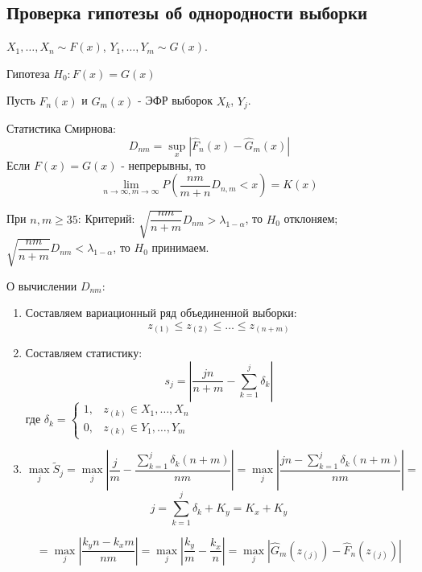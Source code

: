 \subsection{Проверка гипотезы об однородности выборки}

$X_1, \dots, X_n \sim F(x)$, $Y_1, \dots, Y_m \sim G(x)$.

Гипотеза $H_0: F(x) = G(x)$

\begin{theorem}[Смирнов]
  Пусть $\hat F_n(x) $ и $\hat G_m(x)$ - ЭФР выборок $X_k$, $Y_j$.
  
  Статистика Смирнова:
  \[
    D_{nm} = \sup_x |\hat F_n(x) - \hat G_m(x)|
  \]
  Если $F(x) = G(x)$ - непрерывны, то
  \[
    \lim_{n\to\infty, m\to\infty} P(\dfrac{nm}{m+n} D_{n,m} < x) = K(x)
  \]

  При $n, m \geqslant 35$:
  Критерий: $\sqrt{\dfrac{nm}{n+m}} D_{nm} > \lambda_{1-\alpha}$, то $H_0$ отклоняем; $\sqrt{\dfrac{nm}{n+m}} D_{nm} < \lambda_{1-\alpha}$, то $H_0$ принимаем.
\end{theorem}

О вычислении $D_{nm}$:
\begin{enumerate}
  \item Составляем вариационный ряд объединенной выборки:
  \[
    z_{(1)} \leqslant z_{(2)} \leqslant \dots \leqslant z_{(n+m)}
  \]
  \item Составляем статистику:
    \[
      s_j = |\dfrac{jn}{n+m} - \sum_{k=1}^j \delta_k|
    \]
    где $\delta_k = \begin{cases}
      1, &z_{(k)} \in X_1, \dots, X_n \\
      0, &z_{(k)} \in Y_1, \dots, Y_m
    \end{cases}$
  
  \item 
    \[
      \max_j \tilde S_j = \max_j |\dfrac{j}{m} - \dfrac{\sum_{k=1}^j \delta_k(n+m)}{nm}| = \max_j |\dfrac{jn - \sum_{k=1}^j \delta_k (n+m)}{nm}| =
    \]
    \[
      j = \sum_{k=1}^j \delta_k + K_y = K_x + K_y
    \]

    \[
      = \max_j |\dfrac{k_y n - k_x m}{nm}| = \max_j |\dfrac{k_y}{m} - \dfrac{k_x}{n}|
      = \max_j |\hat G_m(z_{(j)}) - \hat F_n (z_{(j)})|
    \]
\end{enumerate}


